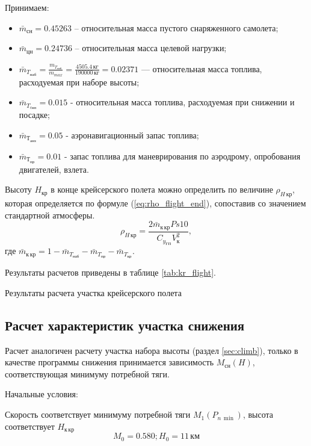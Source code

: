 Принимаем:
\begin{itemize}
    \item $\bar{m}_{сн} = 0.45263$ – относительная масса пустого снаряженного самолета;
    \item $\bar{m}_{цн} = 0.24736$ – относительная масса целевой нагрузки;
    \item $\bar{m}_{T_{наб}} = \frac{m_{T_{наб}}}{m_{max}} = \frac{4505.4\,
        \text{кг}}{190000\, \text{кг}} = 0.02371$ --- относительная масса
        топлива, расходуемая при наборе высоты;
    \item $\bar{m}_{T_{cнп}} =0.015$ - относительная масса топлива, расходуемая при
        снижении и посадке;
    \item $\bar{m}_{Т_{анз}} = 0.05$ - аэронавигационный запас топлива;
    \item $\bar{m}_{Т_{пр}} = 0.01$ - запас топлива для маневрирования по аэродрому, опробования
        двигателей, взлета.
\end{itemize}

Высоту $H_{кр}$ в конце крейсерского полета можно определить по величине
$\rho_{H\, кр}$, которая определяется по формуле (\ref{eq:rho_flight_end}),
сопоставив со значением стандартной атмосферы.
\begin{equation}
    \rho_{H\, {кр}} = \frac{2 \bar{m}_{к\, кр} Ps 10 }{C_{y_{ГП}} V_к^2},
    \label{eq:rho_flight_end}
\end{equation}
где $\bar{m}_{к\, кр} = 1 - \bar{m}_{T_{наб}} - \bar{m}_{T_{пр}} -
\bar{m}_{T_{кр}}$.

Результаты расчетов приведены в таблице \ref{tab:kr_flight}.

\begin{table}[H]
    \centering
    \caption{Результаты расчета участка крейсерского полета}
    \label{tab:kr_flight}
    
\end{table}

\subsection{Расчет характеристик участка снижения}\label{sec:descent}

Расчет аналогичен расчету участка набора высоты (раздел \ref{sec:climb}),
только в качестве программы снижения принимается зависимость $M_{сн}(H)$,
соответствующая минимуму потребной тяги.

Начальные условия:

Скорость соответствует минимуму потребной тяги $M_1(P_{n\, \min})$, высота соответствует $H_{к\, кр}$
\[
    M_0=0.580; H_0 = 11\, \text{км}
\]

